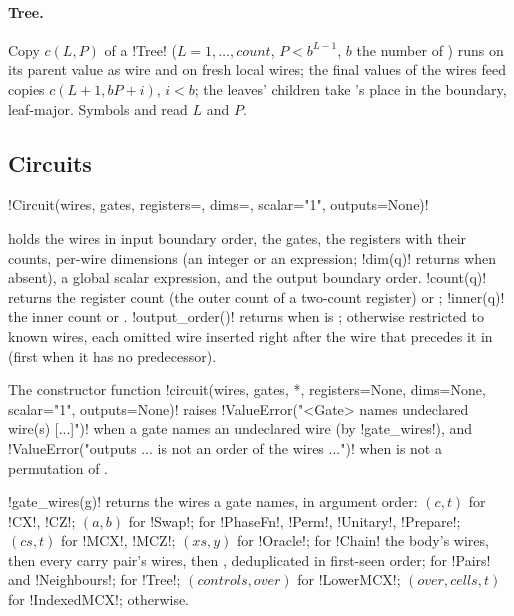 \paragraph{Tree.} Copy $c(L,P)$ of a \py!Tree! ($L = 1,\dots,\mathit{count}$,
$P < b^{L-1}$, $b$ the number of ) runs  on its parent value as wire
 and on fresh local wires; the final values of the  wires feed
copies $c(L+1, bP+i)$, $i<b$; the leaves' children take 's place in the boundary,
leaf-major. Symbols  and  read $L$ and $P$.

\subsection{Circuits}

\begin{signature}
\py!Circuit(wires, gates, registers={}, dims={}, scalar="1", outputs=None)!
\end{signature}
\noindent holds the wires in input boundary order, the gates, the registers with their counts,
per-wire dimensions (an integer or an expression; \py!dim(q)! returns  when absent),
a global scalar expression, and the output boundary order. \py!count(q)! returns the register
count (the outer count of a two-count register) or ; \py!inner(q)! the inner count or
. \py!output_order()! returns  when  is ;
otherwise  restricted to known wires, each omitted wire inserted right after the
wire that precedes it in  (first when it has no predecessor).

The constructor function
\py!circuit(wires, gates, *, registers=None, dims=None, scalar="1", outputs=None)! raises
\py!ValueError("<Gate> names undeclared wire(s) [...]")! when a gate names an undeclared wire
(by \py!gate_wires!), and \py!ValueError("outputs ... is not an order of the wires ...")!
when  is not a permutation of .

\py!gate_wires(g)! returns the wires a gate names, in argument order: $(c,t)$ for \py!CX!,
\py!CZ!; $(a,b)$ for \py!Swap!;  for \py!PhaseFn!, \py!Perm!, \py!Unitary!,
\py!Prepare!; $(\mathit{cs},t)$ for \py!MCX!, \py!MCZ!; $(\mathit{xs},y)$ for \py!Oracle!; for
\py!Chain! the body's wires, then every carry pair's wires, then , deduplicated in
first-seen order;  for \py!Pairs! and \py!Neighbours!;  for
\py!Tree!; $(\mathit{controls}, \mathit{over})$ for \py!LowerMCX!; $(\mathit{over},
\mathit{cells}, t)$ for \py!IndexedMCX!;  otherwise.

